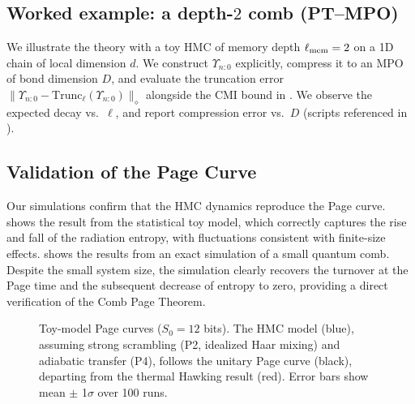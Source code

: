\documentclass[a4paper,11pt]{article}
\newcommand{\HMC}{\textsc{HMC}\xspace}
\theoremstyle{plain}
\theoremstyle{definition}
\theoremstyle{remark}
\begin{document}
\subsection{Worked example: a depth-$2$ comb (PT--MPO)}
\label{sec:worked-example}
We illustrate the theory with a toy \HMC{} of memory depth $\ell_{\rm mem}=2$ on a 1D chain of local dimension $d$.
We construct $\Upsilon_{n{:}0}$ explicitly, compress it to an MPO of bond dimension $D$, and evaluate the truncation error
$\|\Upsilon_{n{:}0}-\mathrm{Trunc}_\ell(\Upsilon_{n{:}0})\|_\diamond$ alongside the CMI bound in .
We observe the expected decay vs.\ $\ell$, and report compression error vs.\ $D$ (scripts referenced in ).

\subsection{Validation of the Page Curve}
Our simulations confirm that the \HMC{} dynamics reproduce the Page curve.  shows the result from the statistical toy model, which correctly captures the rise and fall of the radiation entropy, with fluctuations consistent with finite-size effects.  shows the results from an exact simulation of a small quantum comb. Despite the small system size, the simulation clearly recovers the turnover at the Page time and the subsequent decrease of entropy to zero, providing a direct verification of the Comb Page Theorem.

\begin{figure}[htbp]
    \centering
    \caption{Toy-model Page curves ($S_0=12$ bits). The \HMC{} model (blue), assuming strong scrambling (P2, idealized Haar mixing) and adiabatic transfer (P4), follows the unitary Page curve (black), departing from the thermal Hawking result (red). Error bars show mean $\pm$ 1$\sigma$ over 100 runs.}
    \label{fig:page_curve}
\end{figure}
\end{document}
